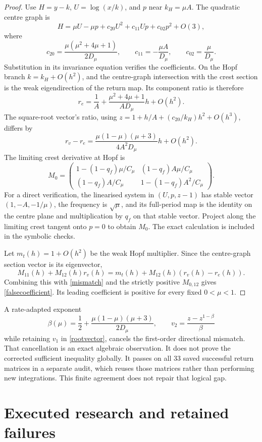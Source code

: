\documentclass[11pt,a4paper]{article}
\theoremstyle{remark}\newtheorem{remark}[theorem]{Remark}
\begin{document}
\begin{proof}
Use $H=y-k$, $U=\log(x/k)$, and $p$ near $k_H=\mu A$. The quadratic centre graph is
\[
 H=\mu U-\mu p+c_{20}U^2+c_{11}Up+c_{02}p^2+O(3),
\]
where
\[
 c_{20}=\frac{\mu(\mu^2+4\mu+1)}{2D_\mu},\qquad
 c_{11}=-\frac{\mu A}{D_\mu},\qquad c_{02}=\frac\mu{D_\mu}.
\]
Substitution in its invariance equation verifies the coefficients. On the Hopf branch $k=k_H+O(h^2)$, and the centre-graph intersection with the crest section is the weak eigendirection of the return map. Its component ratio is therefore
\[
 r_e=\frac1A+\frac{\mu^2+4\mu+1}{A D_\mu}h+O(h^2).
\]
The square-root vector's ratio, using $z=1+h/A+(c_{20}/k_H)h^2+O(h^3)$, differs by
\begin{equation}\label{mismatch}
 r_v-r_e=\frac{\mu(1-\mu)(\mu+3)}{4A^2D_\mu}h+O(h^2).
\end{equation}
The limiting crest derivative at Hopf is
\[
 M_0=\begin{pmatrix}
 1-(1-q_f)\mu/C_\mu &(1-q_f)A\mu/C_\mu\\
 (1-q_f)A/C_\mu&1-(1-q_f)A^2/C_\mu
 \end{pmatrix}.
\]
For a direct verification, the linearised system in $(U,p,z-1)$ has stable vector $(1,-A,-1/\mu)$, the frequency is $\sqrt\mu$, and its full-period map is the identity on the centre plane and multiplication by $q_f$ on that stable vector. Project along the limiting crest tangent onto $p=0$ to obtain $M_0$. The exact calculation is included in the symbolic checks.

Let $m_t(h)=1+O(h^2)$ be the weak Hopf multiplier. Since the centre-graph section vector is its eigenvector,
\[
 M_{11}(h)+M_{12}(h)r_v(h)
 =m_t(h)+M_{12}(h)(r_v(h)-r_e(h)).
\]
Combining this with \eqref{mismatch} and the strictly positive $M_{0,12}$ gives \eqref{falsecoefficient}. Its leading coefficient is positive for every fixed $0<\mu<1$.
\end{proof}

A rate-adapted exponent
\[
 \beta(\mu)=\frac12+\frac{\mu(1-\mu)(\mu+3)}{2D_\mu},\qquad
 v_2=\frac{z-z^{1-\beta}}\beta
\]
while retaining $v_1$ in \eqref{rootvector}, cancels the first-order directional mismatch. That cancellation is an exact algebraic observation. It does not prove the corrected sufficient inequality globally. It passes on all 33 saved successful return matrices in a separate audit, which reuses those matrices rather than performing new integrations. This finite agreement does not repair that logical gap.

\section{Executed research and retained failures}
\end{document}
